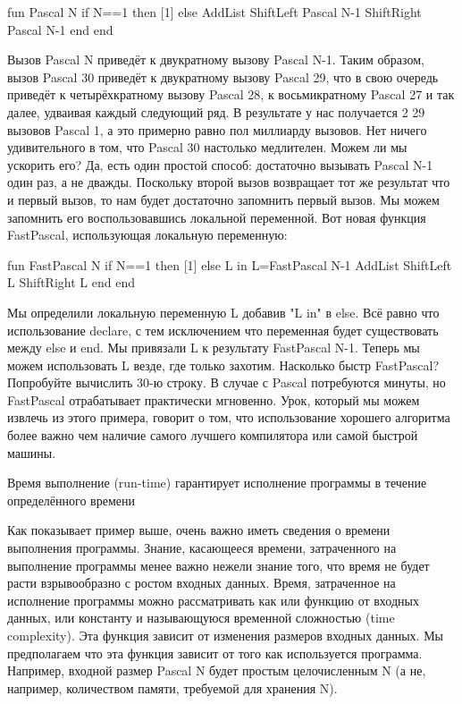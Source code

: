fun {Pascal N}
if N==1 then [1]
else
{AddList {ShiftLeft {Pascal N-1}}
{ShiftRight {Pascal N-1}}}
end
end

Вызов {Pascal N} приведёт к двукратному вызову {Pascal N-1}. Таким образом, вызов {Pascal 30} приведёт к двукратному вызову {Pascal 29}, что в свою очередь приведёт к четырёхкратному вызову {Pascal 28}, к восьмикратному {Pascal 27} и так далее, удваивая каждый следующий ряд. В результате у нас получается 2 29 вызовов {Pascal 1}, а это примерно равно пол миллиарду вызовов. Нет ничего удивительного в том, что {Pascal 30} настолько медлителен. Можем ли мы ускорить его? Да, есть один простой способ: достаточно вызывать {Pascal N-1} один раз, а не дважды. Поскольку второй вызов возвращает тот же результат что и первый вызов, то нам будет достаточно запомнить первый вызов. Мы можем запомнить его воспользовавшись локальной переменной. Вот новая функция FastPascal, использующая локальную переменную:

fun {FastPascal N}
if N==1 then [1]
else L in
L={FastPascal N-1}
{AddList {ShiftLeft L} {ShiftRight L}}
end
end

Мы определили локальную переменную L добавив "L in" в else. Всё равно что использование declare, с тем исключением что переменная будет существовать между else и end. Мы привязали L к результату {FastPascal N-1}. Теперь мы можем использовать L везде, где только захотим. Насколько быстр FastPascal? Попробуйте вычислить 30-ю строку. В случае с Pascal потребуются минуты, но FastPascal отрабатывает практически мгновенно. Урок, который мы можем извлечь из этого примера, говорит о том, что использование хорошего алгоритма более важно чем наличие самого лучшего компилятора или самой быстрой машины.

Время выполнение (run-time) гарантирует исполнение программы в течение определённого времени

Как показывает пример выше, очень важно иметь сведения о времени выполнения программы. Знание, касающееся времени, затраченного на выполнение программы менее важно нежели знание того, что время не будет расти взрывообразно с ростом входных данных. Время, затраченное на исполнение программы можно рассматривать как или функцию от входных данных, или константу и называющуюся временной сложностью (time complexity). Эта функция зависит от изменения размеров входных данных. Мы предполагаем что эта функция зависит от того как используется программа. Например, входной размер {Pascal N} будет простым целочисленным N (а не, например, количеством памяти, требуемой для хранения N).

